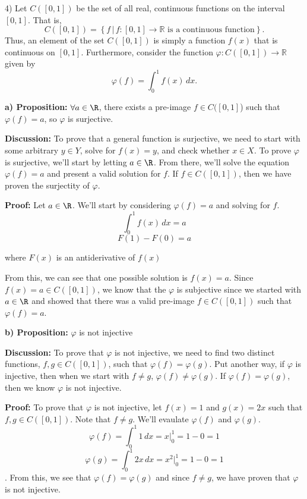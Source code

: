     \begin{paragraph}{4)}
        Let $C([0,1])$ be the set  of all real, continuous functions on the interval $[0,1].$  That is, $$C([0,1]) = \left\{ f \, \vert \, f: [0,1] \to \mathbb R \textrm{   is a continuous function} \right\}.$$  Thus, an element of the set $C([0,1])$ is simply a function $f(x)$ that is continuous on $[0,1]$.   Furthermore, consider the function $\varphi: C([0,1]) \to \mathbb R$ given by $$\varphi (f) = \int_0^1 f(x) \, dx.$$

        \textbf{a) Proposition:} $\forall a \in \R$, there exists a pre-image $f \in C([0, 1]$) such that $\varphi(f) = a$, so $\varphi$ is surjective.
        \spacing

        \textbf{Discussion:} To prove that a general function is surjective, we need to start with some
        arbitrary $y \in Y$, solve for $f(x) = y$, and check whether $x \in X$. To prove $\varphi$ is surjective,
        we'll start by letting $a \in \R$. From there, we'll solve the equation $\varphi(f) = a$
        and present a valid solution for $f$. If $f \in C([0, 1])$, then we have proven the surjectity of $\varphi$.
        \spacing

        \textbf{Proof:} Let $a \in \R$. We'll start by considering $\varphi(f) = a$
        and solving for $f$. 
        $$\int_0^1 f(x) \, dx = a$$
        $$F(1) - F(0) = a$$ 
        \begin{center}
            where $F(x)$ is an antiderivative of $f(x)$
        \end{center}
        From this, we can see that one possible solution is $f(x) = a$.
        Since $f(x) = a \in C([0, 1])$, we know that the $\varphi$ is subjective
        since we started with $a \in \R$ and showed that there was a valid pre-image
        $f \in C([0, 1])$ such that $\varphi(f) = a$.
        
        \bigskip
        \bigskip
        
        \textbf{b) Proposition:} $\varphi$ is not injective
        \spacing
        
        \textbf{Discussion:} To prove that $\varphi$ is not injective,
        we need to find two distinct functions, $f, g \in C([0, 1])$, such that 
        $\varphi(f) = \varphi(g)$. Put another way, if $\varphi$ is injective, then
        when we start with $f \neq g$, $\varphi(f) \neq \varphi(g)$. If 
        $\varphi(f) = \varphi(g)$, then we know $\varphi$ is not injective.
        \spacing

        \textbf{Proof:} To prove that $\varphi$ is not injective,
        let $f(x) = 1$ and $g(x) = 2x$ such that $f, g \in C([0, 1])$. 
        Note that $f \neq g$. We'll evaulate $\varphi(f)$ and $\varphi(g)$.
        $$\varphi(f) = \int_0^1 1 \, dx = x |_0^1 = 1 - 0 = 1$$
        $$\varphi(g) = \int_0^1 2x \, dx = x^2 |_0^1 = 1 - 0 = 1$$.
        From this, we see that $\varphi(f) = \varphi(g)$ and since
        $f \neq g$, we have proven that $\varphi$ is not injective.

    \proofEnd
    \end{paragraph}


